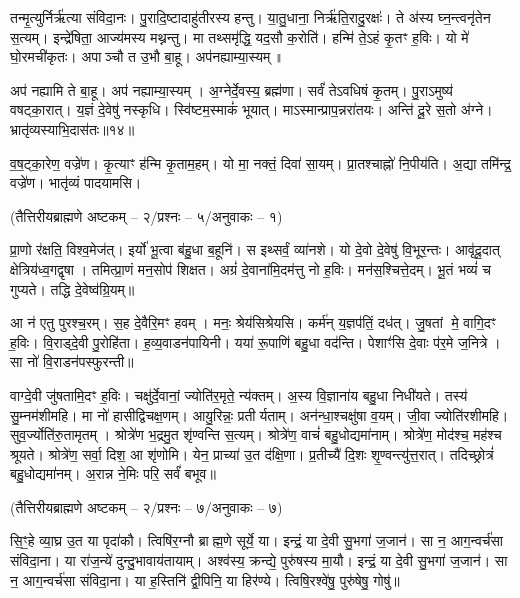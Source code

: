 तन्मृ॒त्युर्निर्\mbox{}ऋ॑त्या संविदा॒नः।
पु॒रादि॒ष्टादाहु॑तीरस्य हन्तु।
या॒तु॒धाना॒ निर्\mbox{}ऋ॑ति॒रादु॒रक्षः॑।
ते अ॑स्य घ्न॒न्त्वनृ॑तेन स॒त्यम्।
इन्द्रे॑षिता॒ आज्य॑मस्य मथ्नन्तु।
मा तथ्समृ॑द्धि॒ यद॒सौ क॒रोति॑।
हन्मि॑ ते॒ऽहं कृ॒तꣳ ह॒विः।
यो मे॑ घो॒रमची॑कृतः।
अपाञ्चौ त उ॒भौ बा॒हू।
अप॑नह्याम्या॒स्यम्॥

अप॑ नह्यामि ते बा॒हू।
अप॑ नह्याम्या॒स्यम्।
अ॒ग्नेर्दे॒वस्य॒ ब्रह्म॑णा।
सर्वं॑ तेऽवधिषं कृ॒तम्।
पु॒राऽमुष्य॑ वषट्का॒रात्।
य॒ज्ञं दे॒वेषु॑ नस्कृधि।
स्वि॑ष्टम॒स्माकं॑ भूयात्।
माऽस्मान्प्राप॒न्न\-रा॑तयः।
अन्ति॑ दू॒रे स॒तो अ॑ग्ने।
भ्रातृ॑व्यस्याभि॒दास॑तः॥१४॥

व॒ष॒ट्का॒रेण॒ वज्रे॑ण।
कृ॒त्याꣳ ह॑न्मि कृ॒ताम॒हम्।
यो मा॒ नक्तं॒ दिवा॑ सा॒यम्।
प्रा॒तश्चाह्नो॑ नि॒पीय॑ति।
अ॒द्या तमि॑न्द्र॒ वज्रे॑ण।
भातृ॑व्यं पादयामसि।

\centerline{\normalsize (तैत्तिरीयब्राह्मणे अष्टकम् – २/प्रश्नः – ५/अनुवाकः – १)}

प्रा॒णो र॑क्षति॒ विश्व॒मेज॑त्।
इर्यो॑ भू॒त्वा ब॑हु॒धा ब॒हूनि॑।
स इथ्सर्वं॒ व्या॑नशे।
यो दे॒वो दे॒वेषु॑ वि॒भूर॒न्तः।
आवृ॑दू॒दात् क्षेत्रिय॑ध्व॒गद्वृषा।
तमित्प्रा॒णं मन॒सोप॑ शिक्षत।
अग्रं॑ दे॒वाना॑मि॒दम॑त्तु नो ह॒विः।
मन॑स॒श्चित्ते॒दम्।
भू॒तं भव्यं॑ च गुप्यते।
तद्धि दे॒वेष्व॑ग्रि॒यम्॥

आ न॑ एतु पुरश्च॒रम्।
स॒ह दे॒वैरि॒मꣳ हवम्।
मनः॒ श्रेय॑सिश्रेयसि।
कर्म॑न् य॒ज्ञप॑तिं॒ दध॑त्।
जु॒षतां मे॒ वागि॒दꣳ ह॒विः।
वि॒राड्दे॒वी पु॒रोहि॑ता।
ह॒व्य॒वाडन॑पायिनी।
यया॑ रू॒पाणि॑ बहु॒धा वद॑न्ति।
पेशाꣳ॑सि दे॒वाः प॑र॒मे ज॒नित्रे।
सा नो॑ वि॒राडन॑पस्फुरन्ती॥

वाग्दे॒वी जु॑षतामि॒दꣳ ह॒विः।
चक्षु॑र्दे॒वानां॒ ज्योति॑र॒मृते॒ न्य॑क्तम्।
अ॒स्य वि॒ज्ञाना॑य बहु॒धा निधी॑यते।
तस्य॑ सु॒म्नम॑शीमहि।
मा नो॑ हासीद्विचक्ष॒णम्।
आयु॒रिन्नः॒ प्रतीर्यताम्।
अन॑न्धा॒श्चक्षु॑षा व॒यम्।
जी॒वा ज्योति॑रशीमहि।
सुव॒र्ज्योति॑रु॒तामृतम्।
श्रोत्रे॑ण भ॒द्रमु॒त शृ॑ण्वन्ति स॒त्यम्।
श्रोत्रे॑ण॒ वाचं॑ बहु॒धोद्यमा॑नाम्।
श्रोत्रे॑ण॒ मोद॑श्च॒ मह॑श्च श्रूयते।
श्रोत्रे॑ण॒ सर्वा॒ दिश॒ आ शृ॑णोमि।
येन॒ प्राच्या॑ उ॒त द॑क्षि॒णा।
प्र॒तीच्यै॑ दि॒शः शृ॒ण्वन्त्यु॑त्त॒रात्।
तदिच्छ्रोत्रं॑ बहु॒धोद्यमा॑नम्।
अ॒रान्न ने॒मिः परि॒ सर्वं॑ बभूव॥

\centerline{\normalsize (तैत्तिरीयब्राह्मणे अष्टकम् – २/प्रश्नः – ७/अनुवाकः – ७)}
सि॒ꣳ॒हे व्या॒घ्र उ॒त या पृदा॑कौ।
त्विषि॑र॒ग्नौ ब्राह्म॒णे सूर्ये॒ या।
इन्द्रं॒ या दे॒वी सु॒भगा॑ ज॒जान॑।
सा न॒ आग॒न्वर्च॑सा संविदा॒ना।
या रा॑ज॒न्ये॑ दुन्दु॒भावाय॑तायाम्।
अश्व॑स्य॒ क्रन्द्ये॒ पुरु॑षस्य मा॒यौ।
इन्द्रं॒ या दे॒वी सु॒भगा॑ ज॒जान॑।
सा न॒ आग॒न्वर्च॑सा संविदा॒ना।
या ह॒स्तिनि॑ द्वी॒पिनि॒ या हिर॑ण्ये।
त्विषि॒रश्वे॑षु॒ पुरु॑षेषु॒ गोषु॑॥

